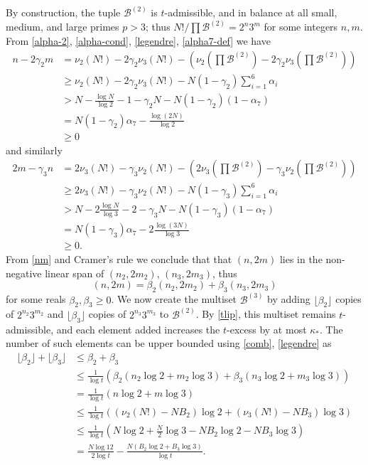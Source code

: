 \documentclass[12pt,a4paper,reqno]{amsart}
\numberwithin{equation}{section}
\theoremstyle{plain}
\theoremstyle{definition}
\newcommand\tuple{{\mathcal B}}
\begin{document}
By construction, the tuple $\tuple^{(2)}$ is $t$-admissible, and in balance at all small, medium, and large primes $p > 3$; thus $N!/\prod \tuple^{(2)} = 2^n 3^m$ for some integers $n,m$.  From \eqref{alpha-2}, \eqref{alpha-cond}, \eqref{legendre}, \eqref{alpha7-def} we have
\begin{align*}
n - 2\gamma_2 m &= \nu_2(N!) - 2\gamma_2 \nu_3(N!) - \left(\nu_2\left(\prod \tuple^{(2)}\right) - 2\gamma_2 \nu_3\left(\prod \tuple^{(2)}\right)\right) \\
&\geq \nu_2(N!) - 2\gamma_2 \nu_3(N!) - N (1-\gamma_2) \sum_{i=1}^6 \alpha_i \\
&> N - 
 \frac{\log N}{\log 2} - 1 - \gamma_2 N - N (1-\gamma_2) (1 - \alpha_7) \\
&= N (1-\gamma_2) \alpha_7 - \frac{\log(2N)}{\log 2} \\
&\geq 0
\end{align*}
and similarly
\begin{align*}
  2m - \gamma_3 n &= 2\nu_3(N!) - \gamma_3 \nu_2(N!) - \left(2\nu_3\left(\prod \tuple^{(2)}\right) - \gamma_3 \nu_2\left(\prod \tuple^{(2)}\right)\right) \\
&\geq 2\nu_3(N!) - \gamma_3 \nu_2(N!) - N (1-\gamma_3) \sum_{i=1}^6 \alpha_i \\
&> N - 2 \frac{\log N}{\log 3} - 2 - \gamma_3 N - N (1-\gamma_3) (1 - \alpha_7) \\ 
&= N (1-\gamma_3) \alpha_7 - 2\frac{\log(3N)}{\log 3} \\
&\geq 0.
\end{align*}
From \eqref{nm} and Cramer's rule we conclude that that $(n,2m)$ lies in the non-negative linear span of $(n_2, 2m_2)$, $(n_3, 2m_3)$, thus
\begin{equation}\label{comb}  (n,2m) = \beta_2 (n_2,2m_2) + \beta_3 (n_3,2m_3)\end{equation}
for some reals $\beta_2,\beta_3 \geq 0$.
We now create the multiset $\tuple^{(3)}$ by adding $\lfloor \beta_2 \rfloor$ copies of $2^{n_2} 3^{m_2}$ and $\lfloor \beta_3 \rfloor$ copies of $2^{n_3} 3^{m_3}$ to $\tuple^{(2)}$.  By \eqref{tlip}, this multiset remains $t$-admissible, and each element added increases the $t$-excess by at most $\kappa_*$.  The number of such elements can be upper bounded using \eqref{comb}, \eqref{legendre} as
\begin{align*}
  \lfloor \beta_2 \rfloor + \lfloor \beta_3 \rfloor &\leq \beta_2 + \beta_3 \\
  &\leq \frac{1}{\log t} \left( \beta_2 (n_2 \log 2 + m_2 \log 3) + \beta_3 (n_3 \log 2 + m_3 \log 3) \right) \\
  &= \frac{1}{\log t} (n \log 2 + m \log 3) \\
  &\leq \frac{1}{\log t} ((\nu_2(N!)-NB_2) \log 2 + (\nu_3(N!)-NB_3) \log 3) \\
  &\leq \frac{1}{\log t} \left(N \log 2 + \frac{N}{2} \log 3 - NB_2 \log 2 - NB_3 \log 3\right) \\
  &= \frac{N \log 12}{2\log t} - \frac{N(B_2 \log 2 + B_3 \log 3)}{\log t}.
\end{align*}
\end{document}
